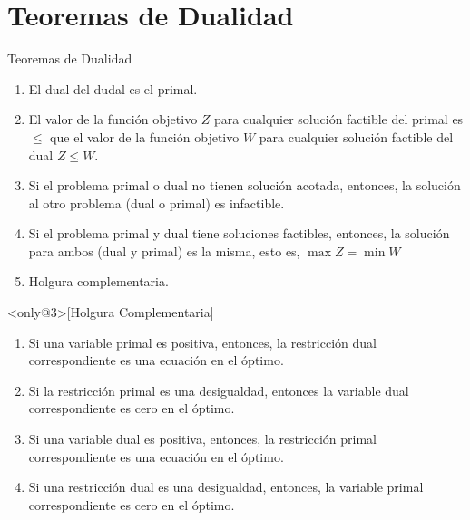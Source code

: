 
\section{Teoremas de Dualidad}
\label{sec:duality-theorems}

\begin{frame}{Teoremas de Dualidad}
  \begin{enumerate} \justifying \parskip4mm
\item<only@1> El dual del dudal es el primal.
\item<only@1> El valor de la función objetivo $Z$ para cualquier solución factible del primal es $\leq$ que el valor de la función objetivo $W$ para cualquier solución factible del dual $Z \leq W$.
\item<only@1> Si el problema primal o dual no tienen solución acotada, entonces, la solución al otro problema (dual o primal) es infactible.
\item<only@2> Si el problema primal y dual tiene soluciones factibles, entonces, la solución para ambos (dual y primal) es la misma, esto es, $\max Z = \min W$
\item<only@2> Holgura complementaria.
\end{enumerate}

\begin{theorem}<only@3>[Holgura Complementaria]
  \begin{enumerate} \justifying \parskip2mm
  \item Si una variable primal es positiva, entonces, la restricción dual correspondiente es una ecuación en el óptimo.
  \item Si la restricción primal es una desigualdad, entonces la variable dual correspondiente es cero en el óptimo.
  \item Si una variable dual es positiva, entonces, la restricción primal correspondiente es una ecuación en el óptimo.
  \item Si una restricción dual es una desigualdad, entonces, la variable primal correspondiente es cero en el óptimo.
  \end{enumerate}
\end{theorem}
\end{frame}


